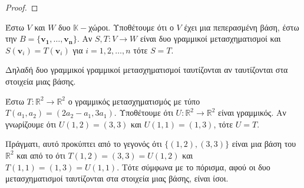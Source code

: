 \begin{proof}

\end{proof}

\begin{cor}
  Έστω $V$ και $W$ δυο $ \mathbb{K}- $χώροι. Υποθέτουμε ότι ο $V$ έχει μια πεπερασμένη 
  βάση, έστω την $ B = \{ \mathbf{v_{1}}, \ldots, \mathbf{v_{n}} \} $. Αν 
  $ S,T \colon V \to W$ είναι δυο γραμμικοί μετασχηματισμοί και 
  $ S(\mathbf{v}_{i}) = T(\mathbf{v}_{i}) $ για $ i=1,2,\ldots,n $ τότε $ S=T $.
\end{cor}

\begin{rem}
  Δηλαδή δυο γραμμικοί γραμμικοί μετασχηματισμοί ταυτίζονται αν ταυτίζονται στα στοιχεία
  μιας βάσης.
\end{rem}

\begin{example}
  Έστω $ T \colon \mathbb{R}^{2} \to \mathbb{R}^{2} $ ο γραμμικός μετασχηματισμός με 
  τύπο $ T(a_{1}, a_{2}) = (2 a_{2}- a_{1}, 3 a_{1}) $. 
  Υποθέτουμε ότι $ U \colon \mathbb{R}^{2} \to \mathbb{R}^{2} $ είναι γραμμικός. Αν 
  γνωρίζουμε ότι $ U(1,2) = (3,3) $ και $ U(1,1) = (1,3) $, τότε $ U=T $. 

  Πράγματι, αυτό προκύπτει από το γεγονός ότι $ \{ (1,2), (3,3) \}  $ είναι μια βάση 
  του $ \mathbb{R}^{2} $ και από το ότι $ T(1,2)=(3,3) = U(1,2) $ και 
  $ T(1,1) = (1,3) = U(1,1) $. Τότε σύμφωνα με το πόρισμα, αφού οι δυο μετασχηματισμοί 
  ταυτίζονται στα στοιχεία μιας βάσης, είναι ίσοι.
\end{example}



 
